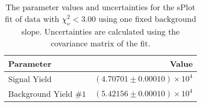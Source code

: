 
\begin{table}[h]
    \begin{center}
        \begin{tabular}{lr}\toprule
            Parameter & Value \\\midrule
            Signal Yield & $(4.70701 \pm 0.00010) \times 10^{4}$ \\
            Background Yield $\#1$ & $(5.42156 \pm 0.00010) \times 10^{4}$ \\\bottomrule
        \end{tabular}
        \caption{The parameter values and uncertainties for the sPlot fit of data with $\chi^2_\nu < 3.00$ using one fixed background slope. Uncertainties are calculated using the covariance matrix of the fit.}
    \end{center}
\end{table}
